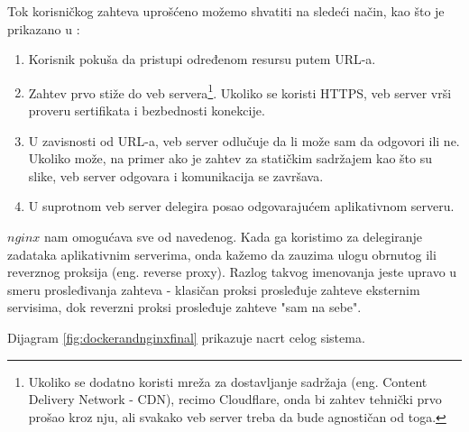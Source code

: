 \documentclass[12pt,oneside]{memoir}
\begin{document}
Tok korisničkog zahteva uprošćeno možemo shvatiti na sledeći način, kao što je prikazano u \cite{webvsappserver}:
\begin{enumerate}
    \item Korisnik pokuša da pristupi određenom resursu putem URL-a.
    \item Zahtev prvo stiže do veb servera\footnote{Ukoliko se dodatno koristi mreža za dostavljanje sadržaja (eng. Content Delivery Network - CDN), recimo Cloudflare, onda bi zahtev tehnički prvo prošao kroz nju, ali svakako veb server treba da bude agnostičan od toga.}. Ukoliko se koristi HTTPS, veb server vrši proveru sertifikata i bezbednosti konekcije.
    \item U zavisnosti od URL-a, veb server odlučuje da li može sam da odgovori ili ne. Ukoliko može, na primer ako je zahtev za statičkim sadržajem kao što su slike, veb server odgovara i komunikacija se završava.
    \item U suprotnom veb server delegira posao odgovarajućem aplikativnom serveru.
\end{enumerate}

$nginx$ \cite{nginxdocs} nam omogućava sve od navedenog. Kada ga koristimo za delegiranje zadataka aplikativnim serverima, onda kažemo da zauzima ulogu obrnutog ili reverznog proksija (eng. reverse proxy). Razlog takvog imenovanja jeste upravo u smeru prosleđivanja zahteva - klasičan proksi prosleđuje zahteve eksternim servisima, dok reverzni proksi prosleđuje zahteve "sam na sebe". 

Dijagram \ref{fig:dockerandnginxfinal} prikazuje nacrt celog sistema.
\end{document}

